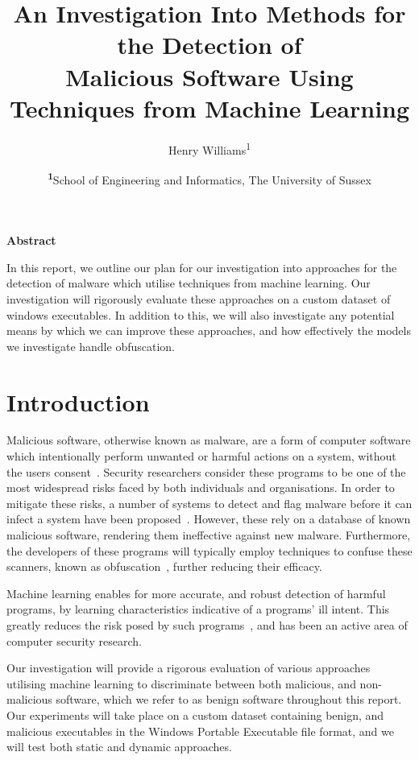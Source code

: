 \documentclass[twocolumn]{article}
\title{An Investigation Into Methods for the Detection of \\Malicious Software Using Techniques from Machine Learning}
\author{ Henry Williams\textsuperscript{1} }
\date{\footnotesize\textsuperscript{\textbf{1}}School of Engineering and Informatics, The University of Sussex}
\begin{document}
\maketitle 

\vspace{1.5em}

{
    \centering 
    {\large \textbf{Abstract}}

    \vspace{1em}

    In this report, we outline our plan for our investigation into approaches for the detection of malware which utilise techniques from machine learning. Our investigation will rigorously evaluate these approaches on a custom dataset of windows executables. In addition to this, we will also investigate any potential means by which we can improve these approaches, and how effectively the models we investigate handle obfuscation.  
}

\section{Introduction}

Malicious software, otherwise known as malware, are a form of computer software which intentionally perform unwanted or harmful actions on a system, without the users consent~\cite{kramer_general_2010}. Security researchers consider these programs to be one of the most widespread risks faced by both individuals and organisations. In order to mitigate these risks, a number of systems to detect and flag malware before it can infect a system have been proposed~\cite{bitdefender2025official,avast2025official,malwarebytes2025official}. However, these rely on a database of known malicious software, rendering them ineffective against new malware. Furthermore, the developers of these programs will typically employ techniques to confuse these scanners, known as obfuscation~\cite{you2010obfuscation}, further reducing their efficacy. 

Machine learning enables for more accurate, and robust detection of harmful programs, by learning characteristics indicative of a programs' ill intent. This greatly reduces the risk posed by such programs~\cite{huda_hybrid-multi_2018,li_dmalnet_2022,karbab_maldozer_2018,vinayakumar_robust_2019}, and has been an active area of computer security research. 

Our investigation will provide a rigorous evaluation of various approaches utilising machine learning to discriminate between both malicious, and non-malicious software, which we refer to as benign software throughout this report. Our experiments will take place on a custom dataset containing benign, and malicious executables in the Windows Portable Executable file format, and we will test both static and dynamic approaches. 
\end{document}
